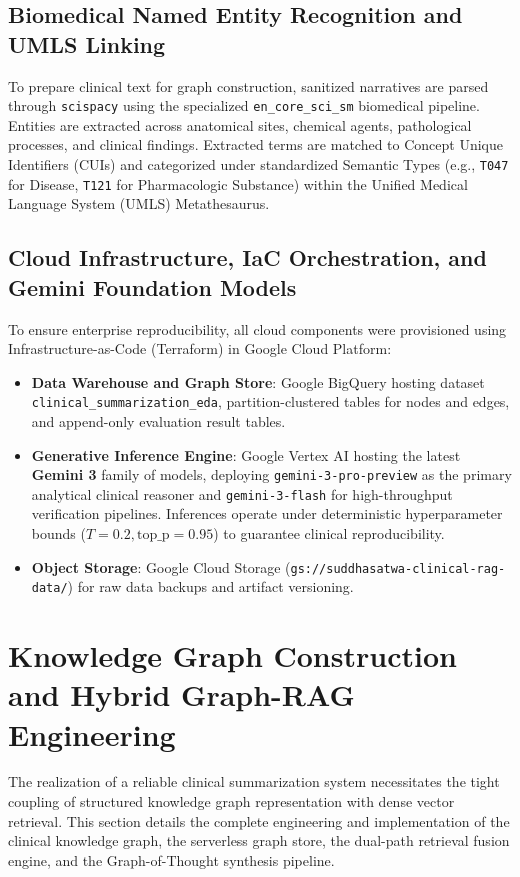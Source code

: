 \documentclass[11pt, a4paper]{article}
\begin{document}
\subsection{Biomedical Named Entity Recognition and UMLS Linking}
To prepare clinical text for graph construction, sanitized narratives are parsed through \texttt{scispacy} using the specialized \texttt{en\_core\_sci\_sm} biomedical pipeline. Entities are extracted across anatomical sites, chemical agents, pathological processes, and clinical findings. Extracted terms are matched to Concept Unique Identifiers (CUIs) and categorized under standardized Semantic Types (e.g., \texttt{T047} for Disease, \texttt{T121} for Pharmacologic Substance) within the Unified Medical Language System (UMLS) Metathesaurus.

\subsection{Cloud Infrastructure, IaC Orchestration, and Gemini Foundation Models}
To ensure enterprise reproducibility, all cloud components were provisioned using Infrastructure-as-Code (Terraform) in Google Cloud Platform:
\begin{itemize}
  \item \textbf{Data Warehouse and Graph Store}: Google BigQuery hosting dataset \texttt{clinical\_summarization\_eda}, partition-clustered tables for nodes and edges, and append-only evaluation result tables.
  \item \textbf{Generative Inference Engine}: Google Vertex AI hosting the latest \textbf{Gemini 3} family of models, deploying \texttt{gemini-3-pro-preview} as the primary analytical clinical reasoner and \texttt{gemini-3-flash} for high-throughput verification pipelines. Inferences operate under deterministic hyperparameter bounds ($T = 0.2, \text{top\_p} = 0.95$) to guarantee clinical reproducibility.
  \item \textbf{Object Storage}: Google Cloud Storage (\texttt{gs://suddhasatwa-clinical-rag-data/}) for raw data backups and artifact versioning.
\end{itemize}

\section{Knowledge Graph Construction and Hybrid Graph-RAG Engineering}
The realization of a reliable clinical summarization system necessitates the tight coupling of structured knowledge graph representation with dense vector retrieval. This section details the complete engineering and implementation of the clinical knowledge graph, the serverless graph store, the dual-path retrieval fusion engine, and the Graph-of-Thought synthesis pipeline.
\end{document}
